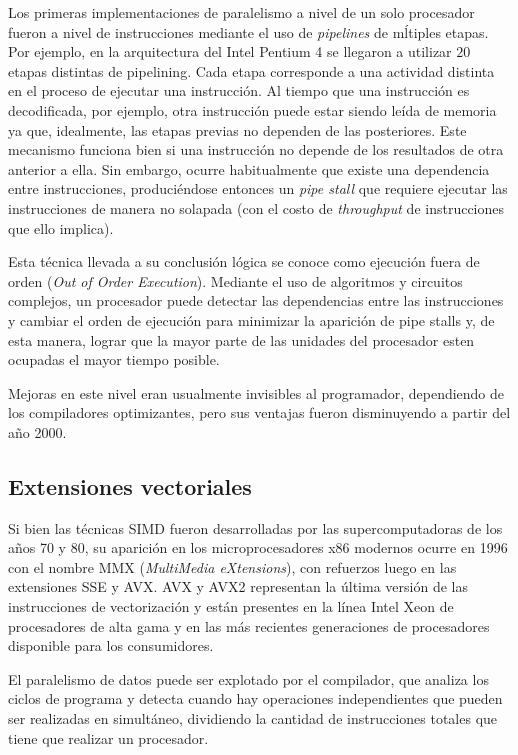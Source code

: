 Los primeras implementaciones de paralelismo a nivel de un solo procesador fueron a nivel de instrucciones mediante el uso de \textit{pipelines} de m\'ltiples etapas. 
Por ejemplo, en la arquitectura del Intel Pentium 4 se llegaron a utilizar $20$ etapas distintas de pipelining. 
Cada etapa corresponde a una actividad distinta en el proceso de ejecutar una instrucci\'on.
Al tiempo que una instrucci\'on es decodificada, por ejemplo, otra instrucci\'on puede estar siendo le\'ida de memoria ya que, idealmente, las etapas previas no dependen de las posteriores. 
Este mecanismo funciona bien si una instrucci\'on no depende de los resultados de otra anterior a ella. 
Sin embargo, ocurre habitualmente que existe una dependencia entre instrucciones, produci\'endose entonces un \textit{pipe stall} que requiere ejecutar las instrucciones de manera no solapada (con el costo de \textit{throughput} de instrucciones que ello implica).

Esta t\'ecnica llevada a su conclusi\'on l\'ogica se conoce como ejecuci\'on fuera de orden (\textit{Out of Order Execution}). 
Mediante el uso de algoritmos y circuitos complejos, un procesador puede detectar las dependencias entre las instrucciones y cambiar el orden de ejecuci\'on para minimizar la aparici\'on de pipe stalls y, de esta manera, lograr que la mayor parte de las unidades del procesador esten ocupadas el mayor tiempo posible.

Mejoras en este nivel eran usualmente invisibles al programador, dependiendo de los compiladores optimizantes, pero sus ventajas fueron disminuyendo a partir del a\~no 2000.

\subsection{Extensiones vectoriales}

Si bien las t\'ecnicas SIMD fueron desarrolladas por las supercomputadoras de los a\~nos 70 y 80, su aparici\'on en los microprocesadores x86 modernos ocurre en 1996 con el nombre MMX (\textit{MultiMedia eXtensions}), con refuerzos luego en las extensiones SSE y AVX. 
AVX y AVX2 representan la \'ultima versi\'on de las instrucciones de vectorizaci\'on y est\'an presentes en la l\'inea Intel Xeon de procesadores de alta gama y en las m\'as recientes generaciones de procesadores disponible para los consumidores.

El paralelismo de datos puede ser explotado por el compilador, que analiza los ciclos de programa y detecta cuando hay operaciones independientes que pueden ser realizadas en simult\'aneo, dividiendo la cantidad de instrucciones totales que tiene que realizar un procesador.

